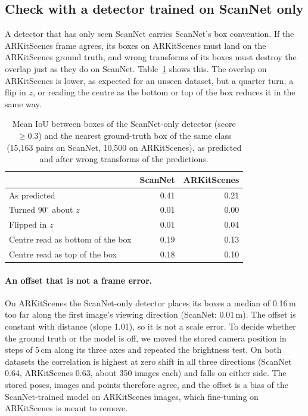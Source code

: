 \subsection{Check with a detector trained on ScanNet only}

A detector that has only seen ScanNet carries ScanNet's box convention. If the ARKitScenes frame agrees, its
boxes on ARKitScenes must land on the ARKitScenes ground truth, and wrong transforms of its boxes must destroy
the overlap just as they do on ScanNet. Table~\ref{tab:vggtdet-model} shows this. The overlap on ARKitScenes
is lower, as expected for an unseen dataset, but a quarter turn, a flip in $z$, or reading the centre as the
bottom or top of the box reduces it in the same way.

\begin{table}[t]
\centering
\caption{Mean IoU between boxes of the ScanNet-only detector (score $\geq 0.3$) and the nearest ground-truth
box of the same class (15,163 pairs on ScanNet, 10,500 on ARKitScenes), as predicted and after wrong
transforms of the predictions.}
\label{tab:vggtdet-model}
\begin{tabular}{lrr}
\toprule
 & ScanNet & ARKitScenes \\
\midrule
As predicted                         & 0.41 & 0.21 \\
Turned $90^\circ$ about $z$          & 0.01 & 0.00 \\
Flipped in $z$                       & 0.01 & 0.04 \\
Centre read as bottom of the box     & 0.19 & 0.13 \\
Centre read as top of the box        & 0.18 & 0.10 \\
\bottomrule
\end{tabular}
\end{table}

\paragraph{An offset that is not a frame error.}
On ARKitScenes the ScanNet-only detector places its boxes a median of 0.16\,m too far along the first image's
viewing direction (ScanNet: 0.01\,m). The offset is constant with distance (slope 1.01), so it is not a scale
error. To decide whether the ground truth or the model is off, we moved the stored camera position in steps of
5\,cm along its three axes and repeated the brightness test. On both datasets the correlation is highest at
zero shift in all three directions (ScanNet 0.64, ARKitScenes 0.63, about 350 images each) and falls on either
side. The stored poses, images and points therefore agree, and the offset is a bias of the ScanNet-trained
model on ARKitScenes images, which fine-tuning on ARKitScenes is meant to remove.

